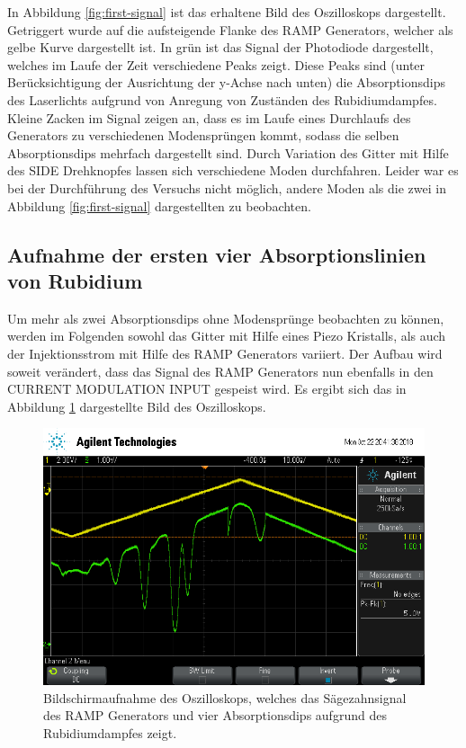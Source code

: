 In Abbildung \ref{fig:first-signal} ist das erhaltene Bild des Oszilloskops dargestellt.
Getriggert wurde auf die aufsteigende Flanke des RAMP Generators, welcher als gelbe
Kurve dargestellt ist. In grün ist das Signal der Photodiode dargestellt, welches
im Laufe der Zeit verschiedene Peaks zeigt. Diese Peaks sind (unter Berücksichtigung
der Ausrichtung der y-Achse nach unten) die Absorptionsdips des
Laserlichts aufgrund von Anregung von Zuständen des Rubidiumdampfes.
Kleine Zacken im Signal zeigen an, dass es im Laufe eines Durchlaufs des Generators
zu verschiedenen Modensprüngen kommt, sodass die selben Absorptionsdips mehrfach
dargestellt sind.
Durch Variation des Gitter mit Hilfe des SIDE Drehknopfes lassen sich verschiedene
Moden durchfahren. Leider war es bei der Durchführung des Versuchs nicht möglich,
andere Moden als die zwei in Abbildung \ref{fig:first-signal} dargestellten zu
beobachten.

\subsection{Aufnahme der ersten vier Absorptionslinien von Rubidium}
\label{sec:AbsorptionImproved}

Um mehr als zwei Absorptionsdips ohne Modensprünge beobachten zu können, werden im Folgenden
sowohl das Gitter mit Hilfe eines Piezo Kristalls, als auch der Injektionsstrom
mit Hilfe des RAMP Generators variiert.
Der Aufbau wird soweit verändert, dass das Signal des RAMP Generators nun ebenfalls
in den CURRENT MODULATION INPUT gespeist wird.
Es ergibt sich das in Abbildung \ref{fig:second-signal} dargestellte Bild des
Oszilloskops.

\begin{figure}
	\centering
	\includegraphics[width=.8\textwidth]{images/second-signal.png}
	\caption{Bildschirmaufnahme des Oszilloskops, welches das Sägezahnsignal des
	RAMP Generators und vier Absorptionsdips aufgrund des Rubidiumdampfes zeigt.}
	\label{fig:second-signal}
\end{figure}

